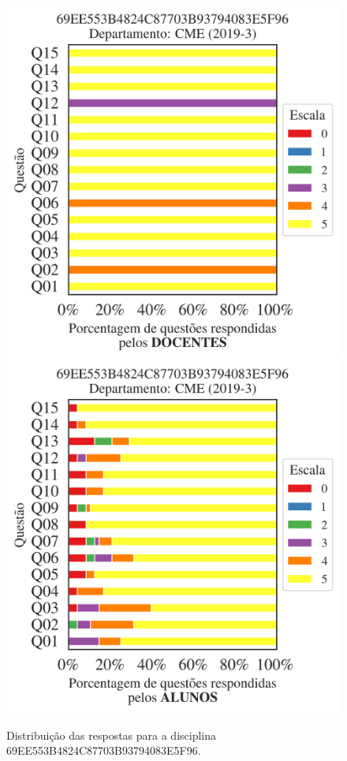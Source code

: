 \documentclass[a4paper,10pt]{article}
\begin{document}
\begin{figure}[h]
\centering
\includegraphics[width=0.485\linewidth]{analise_disciplina_departamento_CME_69EE553B4824C87703B93794083E5F96_docentes.png}
\includegraphics[width=0.485\linewidth]{analise_disciplina_departamento_CME_69EE553B4824C87703B93794083E5F96_alunos.png}
\caption{\label{fig:analise_geral_departamento}                Distribuição das respostas para a disciplina 69EE553B4824C87703B93794083E5F96. }
\end{figure}
\end{document}
